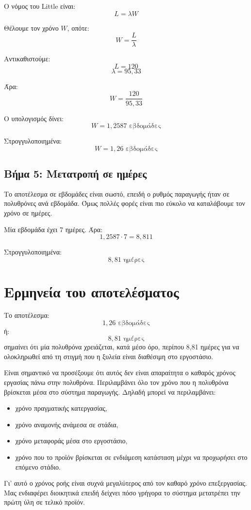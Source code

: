 \documentclass[12pt,a4paper]{article}
\begin{document}
Ο νόμος του Little είναι:
\[
L=\lambda W
\]

Θέλουμε τον χρόνο \(W\), οπότε:
\[
W=\frac{L}{\lambda}
\]

Αντικαθιστούμε:
\[
L=120
\]
\[
\lambda=95{,}33
\]

Άρα:
\[
W=\frac{120}{95{,}33}
\]

Ο υπολογισμός δίνει:
\[
W=1{,}2587 \text{ εβδομάδες}
\]

Στρογγυλοποιημένα:
\[
\boxed{W=1{,}26 \text{ εβδομάδες}}
\]

\subsection{Βήμα 5: Μετατροπή σε ημέρες}

Το αποτέλεσμα σε εβδομάδες είναι σωστό, επειδή ο ρυθμός παραγωγής ήταν σε πολυθρόνες ανά εβδομάδα. Όμως πολλές φορές είναι πιο εύκολο να καταλάβουμε τον χρόνο σε ημέρες.

Μία εβδομάδα έχει 7 ημέρες. Άρα:
\[
1{,}2587\cdot7=8{,}811
\]

Στρογγυλοποιημένα:
\[
\boxed{8{,}81 \text{ ημέρες}}
\]

\section{Ερμηνεία του αποτελέσματος}

Το αποτέλεσμα:
\[
1{,}26 \text{ εβδομάδες}
\]
ή:
\[
8{,}81 \text{ ημέρες}
\]
σημαίνει ότι μία πολυθρόνα χρειάζεται, κατά μέσο όρο, περίπου 8,81 ημέρες για να ολοκληρωθεί από τη στιγμή που η ξυλεία είναι διαθέσιμη στο εργοστάσιο.

Είναι σημαντικό να προσέξουμε ότι αυτός δεν είναι απαραίτητα ο καθαρός χρόνος εργασίας πάνω στην πολυθρόνα. Περιλαμβάνει όλο τον χρόνο που η πολυθρόνα βρίσκεται μέσα στο σύστημα παραγωγής. Δηλαδή μπορεί να περιλαμβάνει:

\begin{itemize}
    \item χρόνο πραγματικής κατεργασίας,
    \item χρόνο αναμονής ανάμεσα σε στάδια,
    \item χρόνο μεταφοράς μέσα στο εργοστάσιο,
    \item χρόνο που το προϊόν βρίσκεται σε ενδιάμεση κατάσταση μέχρι να προχωρήσει στο επόμενο στάδιο.
\end{itemize}

Γι' αυτό ο χρόνος ροής είναι συχνά μεγαλύτερος από τον καθαρό χρόνο επεξεργασίας. Μας ενδιαφέρει διοικητικά επειδή δείχνει πόσο γρήγορα το σύστημα μετατρέπει την πρώτη ύλη σε τελικό προϊόν.
\end{document}
